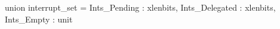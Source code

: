 union interrupt_set = {
  Ints_Pending   : xlenbits,
  Ints_Delegated : xlenbits,
  Ints_Empty     : unit
}
